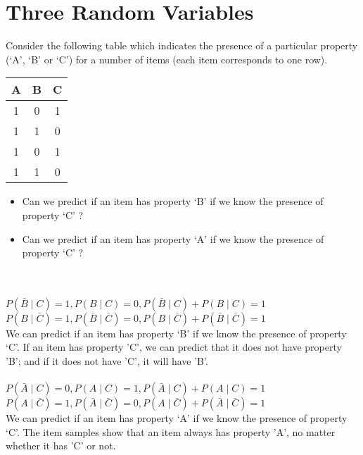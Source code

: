 \documentclass[article,11pt]{article}
\begin{document}
\newpage
\section{Three Random Variables}
Consider the following table which indicates the presence of a particular property 
(`A', `B' or `C') for a number of items (each item corresponds to one row). 

\begin{tabular}{c|c|c}
\hline\hline
A & B & C \\ [0.5ex] %
\hline
1 & 0 & 1\\
1 & 1 & 0 \\
1 & 0 & 1 \\
1 & 1 & 0 \\
\hline
\end{tabular}

\begin{itemize}
\item Can we predict if an item has property `B' if we know the presence of property `C' ?
\item Can we predict if an item has property `A' if we know the presence of property `C' ?
\end{itemize} 

 \\ \\
$P(\bar{B} \mid C)=1,P(B \mid C)=0, P(\bar{B} \mid C)+P(B \mid C)=1$ \\
$P(B \mid \bar{C})=1, P(\bar{B} \mid \bar{C})=0, P(B \mid \bar{C})+P(\bar{B} \mid \bar{C})=1$ \\
We can predict if an item has property `B' if we know the presence of property `C'. If an item has property 'C', we can predict that it does not have property 'B'; and if it does not have 'C', it will have 'B'.\\ \\
$P(\bar{A} \mid C)=0, P(A\mid C)=1,P(\bar{A} \mid C)+P(A\mid C)=1$\\
$P(A \mid \bar{C})=1, P(\bar{A}\mid \bar{C})=0,P(A \mid \bar{C})+P(\bar{A}\mid \bar{C})=1$\\
We can predict if an item has property `A' if we know the presence of property `C'. The item samples show that an item always has property 'A', no matter whether it has 'C' or not.\\ \\
\end{document}
